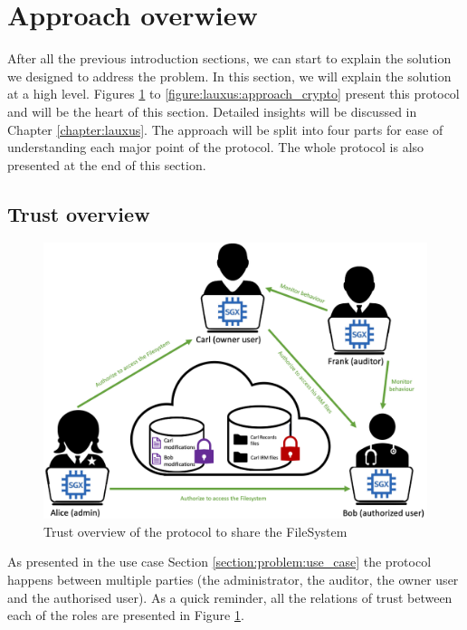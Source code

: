 \documentclass[../main.tex]{subfiles}
\begin{document}
\section{Approach overwiew}
\label{section:lauxus:approach}
\par After all the previous introduction sections, we can start to explain the solution we designed to address the problem. In this section, we will explain the solution at a high level. Figures \ref{figure:lauxus:approach_trust} to \ref{figure:lauxus:approach_crypto} present this protocol and will be the heart of this section. Detailed insights will be discussed in Chapter \ref{chapter:lauxus}. The approach will be split into four parts for ease of understanding each major point of the protocol. The whole protocol is also presented at the end of this section.


\subsection{Trust overview}
\label{section:lauxus:approach_trust}
\begin{figure}[h]
    \centering
    \includegraphics[width=\textwidth]{images/lauxus/approach_trust}
    
    \caption{Trust overview of the protocol to share the FileSystem}
    \label{figure:lauxus:approach_trust}
\end{figure}
\par As presented in the use case Section \ref{section:problem:use_case} the protocol happens between multiple parties (the administrator, the auditor, the owner user and the authorised user). As a quick reminder, all the relations of trust between each of the roles are presented in Figure \ref{figure:lauxus:approach_trust}.
\end{document}
